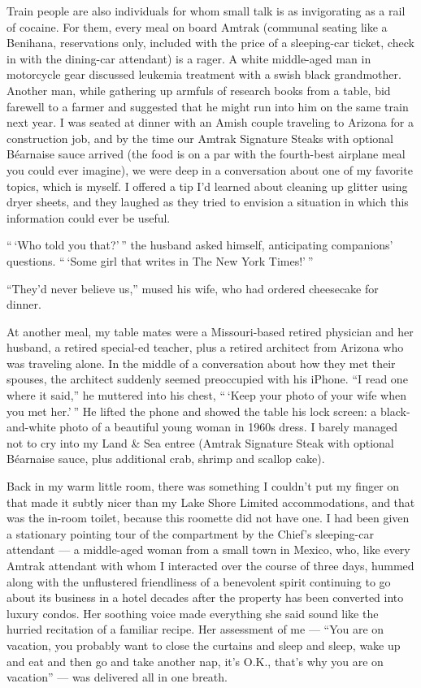 Train people are also individuals for whom small talk is as invigorating
as a rail of cocaine. For them, every meal on board Amtrak (communal
seating like a Benihana, reservations only, included with the price of a
sleeping-car ticket, check in with the dining-car attendant) is a rager.
A white middle-aged man in motorcycle gear discussed leukemia treatment
with a swish black grandmother. Another man, while gathering up armfuls
of research books from a table, bid farewell to a farmer and suggested
that he might run into him on the same train next year. I was seated at
dinner with an Amish couple traveling to Arizona for a construction job,
and by the time our Amtrak Signature Steaks with optional Béarnaise
sauce arrived (the food is on a par with the fourth-best airplane meal
you could ever imagine), we were deep in a conversation about one of my
favorite topics, which is myself. I offered a tip I'd learned about
cleaning up glitter using dryer sheets, and they laughed as they tried
to envision a situation in which this information could ever be useful.

`` `Who told you that?' '' the husband asked himself, anticipating
companions' questions. `` `Some girl that writes in The New York
Times!' ''

``They'd never believe us,'' mused his wife, who had ordered cheesecake
for dinner.

At another meal, my table mates were a Missouri-based retired physician
and her husband, a retired special-ed teacher, plus a retired architect
from Arizona who was traveling alone. In the middle of a conversation
about how they met their spouses, the architect suddenly seemed
preoccupied with his iPhone. ``I read one where it said,'' he muttered
into his chest, `` `Keep your photo of your wife when you met her.' ''
He lifted the phone and showed the table his lock screen: a
black-and-white photo of a beautiful young woman in 1960s dress. I
barely managed not to cry into my Land \& Sea entree (Amtrak Signature
Steak with optional Béarnaise sauce, plus additional crab, shrimp and
scallop cake).

Back in my warm little room, there was something I couldn't put my
finger on that made it subtly nicer than my Lake Shore Limited
accommodations, and that was the in-room toilet, because this roomette
did not have one. I had been given a stationary pointing tour of the
compartment by the Chief's sleeping-car attendant --- a middle-aged
woman from a small town in Mexico, who, like every Amtrak attendant with
whom I interacted over the course of three days, hummed along with the
unflustered friendliness of a benevolent spirit continuing to go about
its business in a hotel decades after the property has been converted
into luxury condos. Her soothing voice made everything she said sound
like the hurried recitation of a familiar recipe. Her assessment of me
--- ``You are on vacation, you probably want to close the curtains and
sleep and sleep, wake up and eat and then go and take another nap, it's
O.K., that's why you are on vacation'' --- was delivered all in one
breath.


